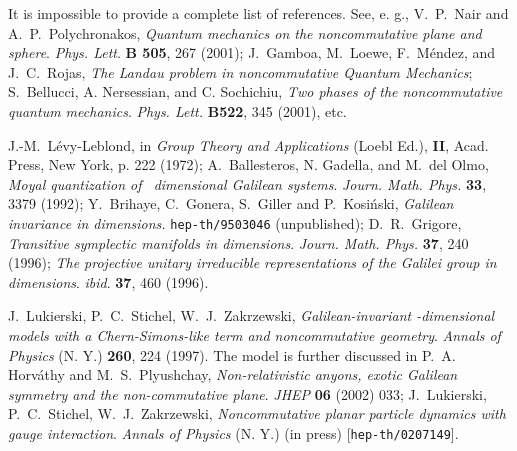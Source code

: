 \documentclass[a4paper,11pt]{article}
\begin{document}
\begin{thebibliography}{99}
It is impossible to provide a complete list of references.
See, e. g.,
V.~P.~Nair and A.~P.~Polychronakos,
{\it Quantum mechanics on the noncommutative plane and sphere}.
{\sl  Phys. Lett}. {\bf B 505}, 267 (2001);
J.~Gamboa, M.~Loewe, F.~M\'endez, and J.~C.~Rojas,
{\it The Landau problem in noncommutative Quantum Mechanics};
  S.~Bellucci, A. Nersessian, and C. Sochichiu,
{\it Two phases of the noncommutative quantum mechanics}.
{\sl Phys. Lett.} {\bf B522}, 345 (2001), etc.

J.-M.~L\'evy-Leblond,
in {\it Group Theory and Applications} (Loebl Ed.),
{\bf II}, Acad. Press, New York, p. 222 (1972);
A.~Ballesteros, N. Gadella, and M.~del Olmo,
{\it Moyal quantization of\ \coordHE{} dimensional
   Galilean systems}.
  {\sl Journ. Math. Phys.} {\bf 33}, 3379 (1992);
Y.~Brihaye, C.~Gonera, S.~Giller and P.~Kosi\'nski,
  {\it Galilean invariance in \coordHE{} dimensions.}
\texttt {hep-th/9503046} (unpublished);
D.~R.~Grigore,
  {\it Transitive symplectic manifolds in \coordHE{} dimensions}.
  {\sl Journ. Math. Phys.} {\bf 37}, 240 (1996);
   {\it The projective unitary irreducible representations of the
  Galilei group in \coordHE{} dimensions}. {\sl ibid}. {\bf 37}, 460 (1996).

J.~Lukierski, P.~C.~Stichel, W.~J.~Zakrzewski,
   {\it Galilean-invariant \coordHE{}-dimensional models with a
     Chern-Simons-like term and \coordHE{} noncommutative geometry}.
  {\sl Annals of Physics}  (N. Y.) {\bf 260}, 224 (1997).
The model is further discussed in
P.~A. Horv\'athy and M.~S.~Plyushchay,
{\it Non-relativistic anyons, exotic Galilean symmetry and the
non-commutative plane}.
{\sl JHEP} {\bf 06} (2002) 033; %
  J.~Lukierski, P.~C.~Stichel, W.~J.~Zakrzewski,
   {\it Noncommutative planar particle dynamics
   with gauge interaction}.
  {\sl Annals of Physics}  (N. Y.) (in press)
[\texttt{hep-th/0207149}].


\end{thebibliography}
\end{document}
